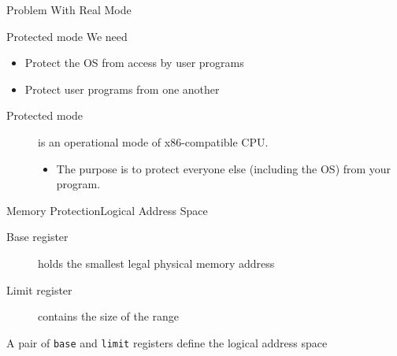 \begin{frame}{Problem With Real Mode}
  \begin{center}
  \end{center}
\end{frame}

\begin{frame}{Protected mode}
  We need
  \begin{itemize}
  \item Protect the OS from access by user programs
  \item Protect user programs from one another
  \end{itemize}
  \begin{description}
  \item[Protected mode] is an operational mode of x86-compatible CPU.
    \begin{itemize}
    \item The purpose is to protect everyone else (including the OS) from your program.
    \end{itemize}
  \end{description}
\end{frame}

\begin{frame}{Memory Protection}{Logical Address Space}
  \begin{description}
  \item[Base register] holds the smallest legal physical memory address
  \item[Limit register] contains the size of the range
  \end{description}
  \begin{varwidth}{.48\textwidth}
    \begin{center}
    \end{center}
  \end{varwidth}\hfill
  \begin{varwidth}{.45\textwidth}
    A pair of \texttt{base} and \texttt{limit} registers define the logical address space
    \begin{center}
    \end{center}
    \begin{center}
      {}
    \end{center}
    \begin{center}
    \end{center}
  \end{varwidth}
\end{frame}

